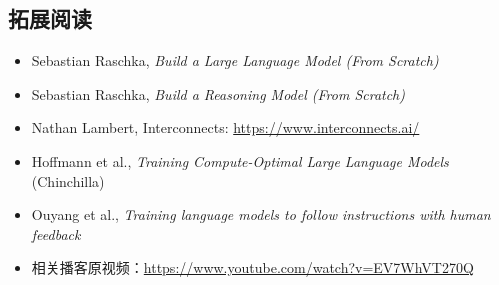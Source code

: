 \documentclass[a4paper]{article}
\begin{document}
\subsection{拓展阅读}

\begin{itemize}[leftmargin=1.5em]
    \item Sebastian Raschka, \textit{Build a Large Language Model (From Scratch)}
    \item Sebastian Raschka, \textit{Build a Reasoning Model (From Scratch)}
    \item Nathan Lambert, Interconnects: \url{https://www.interconnects.ai/}
    \item Hoffmann et al., \textit{Training Compute-Optimal Large Language Models} (Chinchilla)
    \item Ouyang et al., \textit{Training language models to follow instructions with human feedback}
    \item 相关播客原视频：\url{https://www.youtube.com/watch?v=EV7WhVT270Q}
\end{itemize}
\end{document}

